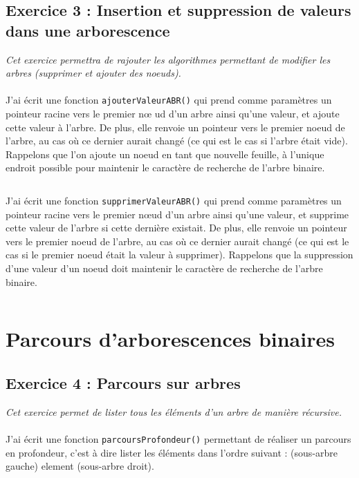 \subsection{Exercice 3 : Insertion et suppression de valeurs dans une arborescence}
\textit{Cet exercice permettra de rajouter les algorithmes permettant de modifier les arbres (supprimer et ajouter des noeuds).}
\\\\
J'ai écrit une fonction \texttt{ajouterValeurABR()} qui prend comme paramètres un pointeur racine vers le premier nœ ud d’un arbre ainsi qu’une valeur, et ajoute cette valeur à l’arbre. De plus, elle renvoie un pointeur vers le premier noeud de l’arbre, au cas où ce dernier aurait changé (ce qui est le cas si l’arbre était vide). Rappelons que l’on ajoute un noeud en tant que nouvelle feuille, à l’unique endroit possible pour maintenir le caractère de recherche de l’arbre binaire.
\inputminted[linenos,firstline=8,lastline=19]{cpp}{../sources/cpp/TP3-4/modifArbres.c}

J'ai écrit une fonction \texttt{supprimerValeurABR()} qui prend comme paramètres un pointeur racine vers le premier nœud d’un arbre ainsi qu’une valeur, et supprime cette valeur de l’arbre si cette dernière existait. De plus, elle renvoie un pointeur vers le premier noeud de l’arbre, au cas où ce dernier aurait changé (ce qui est le cas si le premier noeud était la valeur à supprimer). Rappelons que la suppression d’une valeur d’un noeud doit maintenir le caractère de recherche de l’arbre binaire.
\inputminted[linenos,firstline=21,lastline=105]{cpp}{../sources/cpp/TP3-4/modifArbres.c}

\section{Parcours d’arborescences binaires}

\subsection{Exercice 4 : Parcours sur arbres}
\textit{Cet exercice permet de lister tous les éléments d'un arbre de manière récursive.}
\\\\
J'ai écrit une fonction \texttt{parcoursProfondeur()} permettant de réaliser un parcours en profondeur, c’est à dire lister les éléments dans l’ordre suivant : (sous-arbre gauche) element (sous-arbre droit).
\inputminted[linenos,firstline=8,lastline=18]{cpp}{../sources/cpp/TP3-4/parcoursArbres.c}
